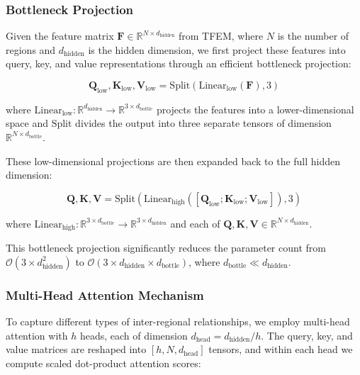 \documentclass[a4paper,fleqn]{cas-dc}
\begin{document}
\subsubsection{Bottleneck Projection}

Given the feature matrix $\mathbf{F} \in \mathbb{R}^{N \times d_{\text{hidden}}}$ from TFEM, where $N$ is the number of regions and $d_{\text{hidden}}$ is the hidden dimension, we first project these features into query, key, and value representations through an efficient bottleneck projection:

\begin{equation}
\mathbf{Q}_{\text{low}}, \mathbf{K}_{\text{low}}, \mathbf{V}_{\text{low}} = \text{Split}(\text{Linear}_{\text{low}}(\mathbf{F}), 3)
\end{equation}

where $\text{Linear}_{\text{low}}: \mathbb{R}^{d_{\text{hidden}}} \rightarrow \mathbb{R}^{3 \times d_{\text{bottle}}}$ projects the features into a lower-dimensional space and $\text{Split}$ divides the output into three separate tensors of dimension $\mathbb{R}^{N \times d_{\text{bottle}}}$.

These low-dimensional projections are then expanded back to the full hidden dimension:

\begin{equation}
\mathbf{Q}, \mathbf{K}, \mathbf{V} = \text{Split}(\text{Linear}_{\text{high}}([\mathbf{Q}_{\text{low}}; \mathbf{K}_{\text{low}}; \mathbf{V}_{\text{low}}]), 3)
\end{equation}

where $\text{Linear}_{\text{high}}: \mathbb{R}^{3 \times d_{\text{bottle}}} \rightarrow \mathbb{R}^{3 \times d_{\text{hidden}}}$ and each of $\mathbf{Q}, \mathbf{K}, \mathbf{V} \in \mathbb{R}^{N \times d_{\text{hidden}}}$.

This bottleneck projection significantly reduces the parameter count from $\mathcal{O}(3 \times d_{\text{hidden}}^2)$ to $\mathcal{O}(3 \times d_{\text{hidden}} \times d_{\text{bottle}})$, where $d_{\text{bottle}} \ll d_{\text{hidden}}$.

\subsubsection{Multi-Head Attention Mechanism}

To capture different types of inter-regional relationships, we employ multi-head attention with $h$ heads, each of dimension $d_{\text{head}} = d_{\text{hidden}} / h$. The query, key, and value matrices are reshaped into $[h, N, d_{\text{head}}]$ tensors, and within each head we compute scaled dot-product attention scores:
\end{document}
